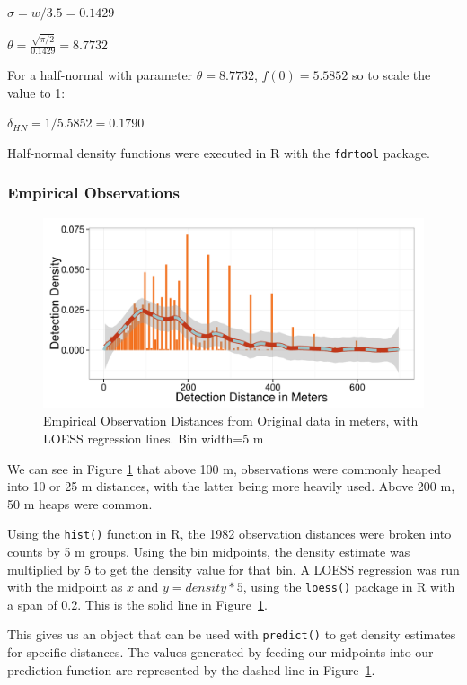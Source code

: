 \documentclass[12pt]{article}
\begin{document}
$\sigma = w/3.5 = 0.1429$

$\theta = \frac{\sqrt{\pi /2}}{0.1429}=8.7732$

For a half-normal with parameter $\theta=8.7732$, $f(0)=5.5852$ so to scale the value to 1:
\begin{center}
$\delta_{HN} = 1/5.5852 = 0.1790$
\end{center}


Half-normal density functions were executed in R with the \texttt{fdrtool} package.

\subsubsection{Empirical Observations}
\begin{figure}
	\includegraphics[width=\textwidth]{../images/loess.pdf}
	\caption{Empirical Observation Distances from Original data in meters, with LOESS regression lines. Bin width=5 m\label{fig:by5}}
\end{figure}

We can see in Figure \ref{fig:by5} that above 100 m, observations were commonly heaped into 10 or 25 m distances, with the latter being more heavily used. Above 200 m, 50 m heaps were common. 

Using the \texttt{hist()} function in R, the 1982 observation distances were broken into counts by 5 m groups. Using the bin midpoints, the density estimate was multiplied by 5 to get the density value for that bin. A LOESS regression was run with the midpoint as $x$ and $y=density*5$, using the \texttt{loess()} package in R with a span of 0.2. This is the solid line in Figure~\ref{fig:by5}. 

This gives us an object that can be used with \texttt{predict()} to get density estimates for specific distances. The values generated by feeding our midpoints into our prediction function are represented by the dashed line in Figure~\ref{fig:by5}. 
\end{document}

